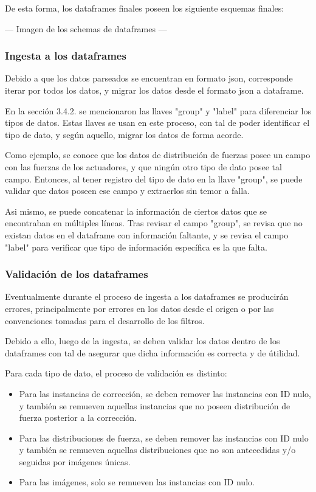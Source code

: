 De esta forma, los dataframes finales poseen los siguiente esquemas finales:

--- Imagen de los schemas de dataframes ---

\subsubsection{Ingesta a los dataframes}

Debido a que los datos parseados se encuentran en formato json, corresponde iterar por todos los datos, y migrar los datos desde el formato json a dataframe.

En la sección 3.4.2. se mencionaron las llaves "group" y "label" para diferenciar los tipos de datos. Estas llaves se usan en este proceso, con tal de poder identificar el tipo de dato, y según aquello, migrar los datos de forma acorde.

Como ejemplo, se conoce que los datos de distribución de fuerzas posee un campo con las fuerzas de los actuadores, y que ningún otro tipo de dato posee tal campo. Entonces, al tener registro del tipo de dato en la llave "group", se puede validar que datos poseen ese campo y extraerlos sin temor a falla.

Asi mismo, se puede concatenar la información de ciertos datos que se encontraban en múltiples líneas. Tras revisar el campo "group", se revisa que no existan datos en el dataframe con información faltante, y se revisa el campo "label" para verificar que tipo de información específica es la que falta.

\subsubsection{Validación de los dataframes}

Eventualmente durante el proceso de ingesta a los dataframes se producirán errores, principalmente por errores en los datos desde el origen o por las convenciones tomadas para el desarrollo de los filtros.

Debido a ello, luego de la ingesta, se deben validar los datos dentro de los dataframes con tal de asegurar que dicha información es correcta y de útilidad.

Para cada tipo de dato, el proceso de validación es distinto:

\begin{itemize}
    \item Para las instancias de corrección, se deben remover las instancias con ID nulo, y también se remueven aquellas instancias que no poseen distribución de fuerza posterior a la corrección.

    \item Para las distribuciones de fuerza, se deben remover las instancias con ID nulo y también se remueven aquellas distribuciones que no son antecedidas y/o seguidas por imágenes únicas.

    \item Para las imágenes, solo se remueven las instancias con ID nulo.
\end{itemize}

